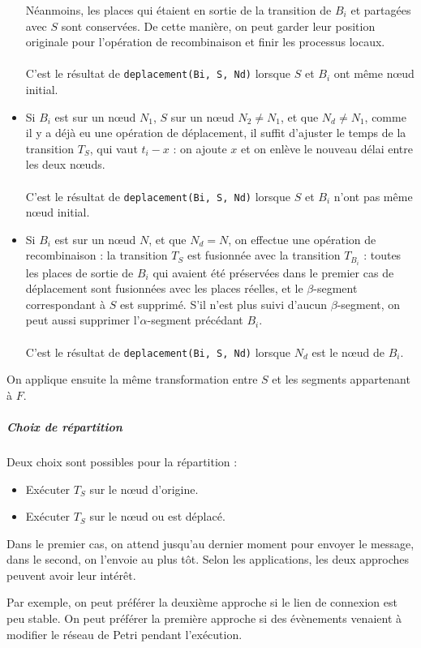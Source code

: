 \begin{itemize}
{Néanmoins, les places qui étaient en sortie de la transition de $B_i$ et partagées avec $S$ sont conservées. De cette manière, on peut garder leur position originale pour l'opération de recombinaison et finir les processus locaux.
~ \\
~ \\
C'est le résultat de \texttt{deplacement(Bi, S, Nd)} lorsque $S$ et $B_i$ ont même nœud initial.
}
\\
\item Si $B_i$ est sur un nœud $N_1$, $S$ sur un nœud $N_2 \neq N_1$, et que $N_d \neq N_1$, comme il y a déjà eu une opération de déplacement, il suffit d'ajuster le temps de la transition $T_S$, qui vaut $t_i - x$ : on ajoute $x$ et on enlève le nouveau délai entre les deux nœuds.
~ \\
~ \\
C'est le résultat de \texttt{deplacement(Bi, S, Nd)} lorsque $S$ et $B_i$ n'ont pas même nœud initial.
\\
\item Si $B_i$ est sur un nœud $N$, et que $N_d = N$, on effectue une opération de recombinaison : la transition $T_S$ est fusionnée avec la transition $T_{B_i}$ : toutes les places de sortie de $B_i$ qui avaient été préservées dans le premier cas de déplacement sont fusionnées avec les places réelles, et le $\beta$-segment correspondant à $S$ est supprimé. S'il n'est plus suivi d'aucun $\beta$-segment, on peut aussi supprimer l'$\alpha$-segment précédant $B_i$.
~ \\
~ \\
C'est le résultat de \texttt{deplacement(Bi, S, Nd)} lorsque $N_d$ est le nœud de $B_i$.
\end{itemize}

On applique ensuite la même transformation entre $S$ et les segments appartenant à $F$.

\subparagraph{Choix de répartition}
Deux choix sont possibles pour la répartition : 
\begin{itemize}
\item Exécuter $T_S$ sur le nœud d'origine.
\item Exécuter $T_S$ sur le nœud ou est déplacé.
\end{itemize}

Dans le premier cas, on attend jusqu'au dernier moment pour envoyer le message, dans le second, on l'envoie au plus tôt. Selon les applications, les deux approches peuvent avoir leur intérêt.

Par exemple, on peut préférer la deuxième approche si le lien de connexion est peu stable. On peut préférer la première approche si des évènements venaient à modifier le réseau de Petri pendant l'exécution.



